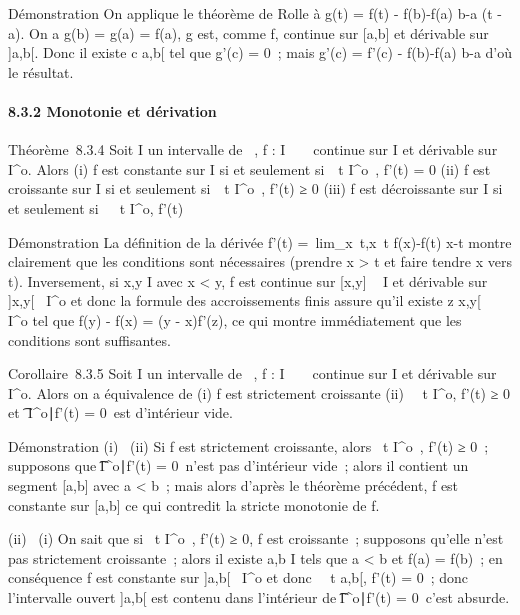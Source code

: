 \documentclass[]{article}
\begin{document}
Démonstration On applique le théorème de Rolle à g(t) = f(t) -
f(b)-f(a) \over b-a (t - a). On a g(b) = g(a) = f(a), g
est, comme f, continue sur {[}a,b{]} et dérivable sur {]}a,b{[}. Donc il
existe c \in{]}a,b{[} tel que g'(c) = 0~; mais g'(c) = f'(c) - f(b)-f(a)
\over b-a d'où le résultat.

\paragraph{8.3.2 Monotonie et dérivation}

Théorème~8.3.4 Soit I un intervalle de ~, f : I \rightarrow~ ~ continue sur I et
dérivable sur I^o. Alors (i) f est constante sur I si et
seulement si~\forall~t \in I^o~, f'(t) = 0
(ii) f est croissante sur I si et seulement
si~\forall~t \in I^o~, f'(t) ≥ 0 (iii) f est
décroissante sur I si et seulement si~\forall~~t \in
I^o, f'(t) 

Démonstration La définition de la dérivée f'(t)
=\
lim\_x\rightarrow~t,x\neq~t f(x)-f(t)
\over x-t montre clairement que les conditions sont
nécessaires (prendre x \textgreater{} t et faire tendre x vers t).
Inversement, si x,y \in I avec x \textless{} y, f est continue sur
{[}x,y{]} \subset~ I et dérivable sur {]}x,y{[}\subset~ I^o et donc la
formule des accroissements finis assure qu'il existe z \in{]}x,y{[}\subset~
I^o tel que f(y) - f(x) = (y - x)f'(z), ce qui montre
immédiatement que les conditions sont suffisantes.

Corollaire~8.3.5 Soit I un intervalle de ~, f : I \rightarrow~ ~ continue sur I et
dérivable sur I^o. Alors on a équivalence de (i) f est
strictement croissante (ii) \forall~~t \in
I^o, f'(t) ≥ 0 et \t \in
I^o∣f'(t) = 0\
est d'intérieur vide.

Démonstration (i) \rigtharrow~(ii) Si f est strictement croissante, alors
\forall~t \in I^o~, f'(t) ≥ 0~; supposons que
\t \in I^o∣f'(t) =
0\ n'est pas d'intérieur vide~; alors il contient un
segment {[}a,b{]} avec a \textless{} b~; mais alors d'après le théorème
précédent, f est constante sur {[}a,b{]} ce qui contredit la stricte
monotonie de f.

(ii) \rigtharrow~(i) On sait que si \forall~t \in I^o~,
f'(t) ≥ 0, f est croissante~; supposons qu'elle n'est pas strictement
croissante~; alors il existe a,b \in I tels que a \textless{} b et f(a) =
f(b)~; en conséquence f est constante sur {]}a,b{[}\subset~ I^o et
donc \forall~~t \in{]}a,b{[}, f'(t) = 0~; donc
l'intervalle ouvert {]}a,b{[} est contenu dans l'intérieur de
\t \in I^o∣f'(t) =
0\, c'est absurde.
\end{document}
